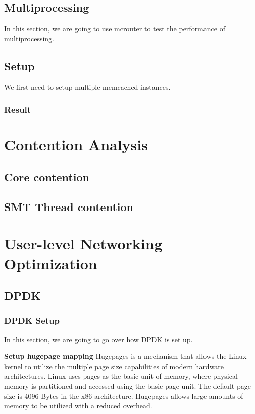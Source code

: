 \documentclass[bsc,frontabs,twoside,singlespacing,parskip,deptreport]{infthesis}     %
\begin{document}
\section{Multiprocessing}
In this section, we are going to use mcrouter to test the performance of multiprocessing.

\section{Setup}
We first need to setup multiple memcached instances. 

\subsection{Result}



\chapter{Contention Analysis}

\section{Core contention}

\section{SMT Thread contention}





\chapter{User-level Networking Optimization}

\section{DPDK}

\subsection{DPDK Setup}

In this section, we are going to go over how DPDK is set up.


\textbf{Setup hugepage mapping} Hugepages is a mechanism that allows the Linux kernel to utilize the multiple page size capabilities of modern hardware architectures. Linux uses pages as the basic unit of memory, where physical memory is partitioned and accessed using the basic page unit. The default page size is 4096 Bytes in the x86 architecture. Hugepages allows large amounts of memory to be utilized with a reduced overhead.
\end{document}
